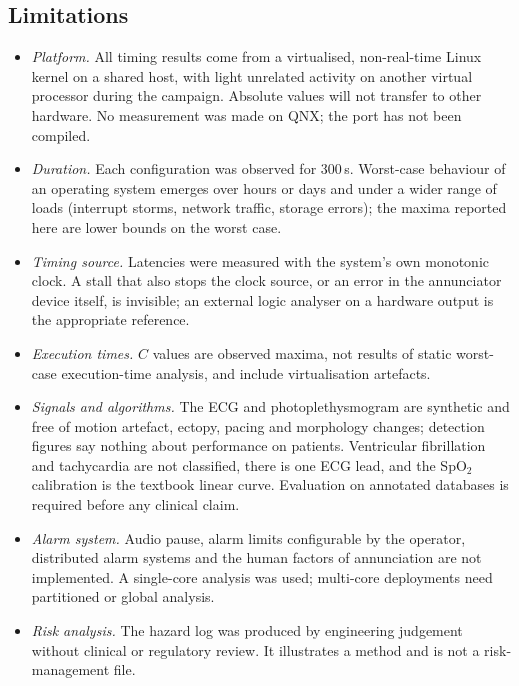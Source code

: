 \subsection{Limitations}
\begin{itemize}
\item \emph{Platform.} All timing results come from a virtualised, non-real-time Linux kernel on a shared host, with light unrelated activity on another virtual processor during the campaign. Absolute values will not transfer to other hardware. No measurement was made on QNX; the port has not been compiled.
\item \emph{Duration.} Each configuration was observed for 300\,s. Worst-case behaviour of an operating system emerges over hours or days and under a wider range of loads (interrupt storms, network traffic, storage errors); the maxima reported here are lower bounds on the worst case.
\item \emph{Timing source.} Latencies were measured with the system's own monotonic clock. A stall that also stops the clock source, or an error in the annunciator device itself, is invisible; an external logic analyser on a hardware output is the appropriate reference.
\item \emph{Execution times.} $C$ values are observed maxima, not results of static worst-case execution-time analysis, and include virtualisation artefacts.
\item \emph{Signals and algorithms.} The ECG and photoplethysmogram are synthetic and free of motion artefact, ectopy, pacing and morphology changes; detection figures say nothing about performance on patients. Ventricular fibrillation and tachycardia are not classified, there is one ECG lead, and the SpO$_2$ calibration is the textbook linear curve. Evaluation on annotated databases \cite{goldberger2000,moody2001,clifford2015} is required before any clinical claim.
\item \emph{Alarm system.} Audio pause, alarm limits configurable by the operator, distributed alarm systems and the human factors of annunciation are not implemented. A single-core analysis was used; multi-core deployments need partitioned or global analysis.
\item \emph{Risk analysis.} The hazard log was produced by engineering judgement without clinical or regulatory review. It illustrates a method and is not a risk-management file.
\end{itemize}

